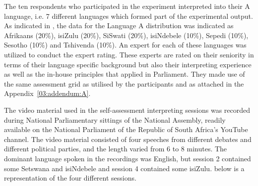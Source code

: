 \documentclass[output=paper]{langsci/langscibook}
\begin{document}
The ten respondents who participated in the experiment interpreted into their A language, i.e. 7 different languages which formed part of the experimental output. As indicated in , the data for the Language A distribution was indicated as Afrikaans (20\%), isiZulu (20\%), SiSwati (20\%), isiNdebele (10\%), Sepedi (10\%), Sesotho (10\%) and Tshivenda (10\%). An expert for each of these languages was utilized to conduct the expert rating. These experts are rated on their seniority in terms of their language specific background but also their interpreting experience as well as the in-house principles that applied in Parliament. They made use of the same assessment grid as utilised by the participants and as attached in the Appendix~\ref{03:addendum:A}.

The video material used in the self-assessment interpreting sessions was re\-corded during National Parliamentary sittings of the National Assembly, readily available on the National Parliament of the Republic of South Africa’s YouTube channel. The video material consisted of four speeches from different debates and different political parties, and the length varied from 6 to 8 minutes. The dominant language spoken in the recordings was English, but session 2 contained some Setswana and isiNdebele and session 4 contained some isiZulu.  below is a representation of the four different sessions.

\begin{table}
\caption{\label{tab:deysel:3a}Summary of the different interpreting sessions}
\end{table}
\end{document}
